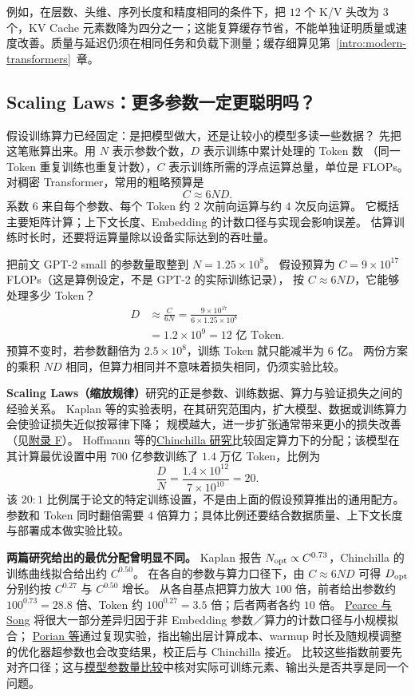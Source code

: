 例如，在层数、头维、序列长度和精度相同的条件下，把 $12$ 个 K/V 头改为 $3$ 个，KV Cache 元素数降为四分之一；这能复算缓存节省，不能单独证明质量或速度改善。质量与延迟仍须在相同任务和负载下测量；缓存细算见第~\ref*{intro:modern-transformers}~章。

\subsection{Scaling Laws：更多参数一定更聪明吗？}
\label{sec:scaling-compute-budget}

假设训练算力已经固定：是把模型做大，还是让较小的模型多读一些数据？
先把这笔账算出来。用 $N$ 表示参数个数，$D$ 表示训练中累计处理的 Token 数
（同一 Token 重复训练也重复计数），$C$ 表示训练所需的浮点运算总量，单位是 FLOPs。
对稠密 Transformer，常用的粗略预算是
\[
\boxed{C\approx6ND.}
\]
系数 $6$ 来自每个参数、每个 Token 约 $2$ 次前向运算与约 $4$ 次反向运算。
它概括主要矩阵计算；上下文长度、Embedding 的计数口径与实现会影响误差。
估算训练时长时，还要将运算量除以设备实际达到的吞吐量。

把前文 GPT-2 small 的参数量取整到 $N=1.25\times10^8$。
假设预算为 $C=9\times10^{17}$ FLOPs（这是算例设定，不是 GPT-2 的实际训练记录），
按 $C\approx6ND$，它能够处理多少 Token？
\[
\begin{aligned}
D&\approx\frac{C}{6N}
=\frac{9\times10^{17}}{6\times1.25\times10^8}\\
&=1.2\times10^9=\boxed{12\text{ 亿 Token}}.
\end{aligned}
\]
预算不变时，若参数翻倍为 $2.5\times10^8$，训练 Token 就只能减半为 $6$ 亿。
两份方案的乘积 $ND$ 相同，但算力相同并不意味着损失相同，仍须实验比较。

\textbf{Scaling Laws（缩放规律）}研究的正是参数、训练数据、算力与验证损失之间的经验关系。
Kaplan 等的实验表明，在其研究范围内，扩大模型、数据或训练算力会使验证损失近似按幂律下降；
规模越大，进一步扩张通常带来更小的损失改善（见\hyperref[source:scaling-laws]{附录 F}）。
Hoffmann 等的\hyperref[source:chinchilla]{Chinchilla 研究}比较固定算力下的分配；该模型在其计算最优设置中用
$700$ 亿参数训练了 $1.4$ 万亿 Token，比例为
\[
\frac{D}{N}=\frac{1.4\times10^{12}}{7\times10^{10}}=20.
\]
该 $20:1$ 比例属于论文的特定训练设置，不是由上面的假设预算推出的通用配方。
参数和 Token 同时翻倍需要 $4$ 倍算力；具体比例还要结合数据质量、上下文长度与部署成本做实验比较。

\textbf{两篇研究给出的最优分配曾明显不同。}
Kaplan 报告 $N_{\rm opt}\propto C^{0.73}$，Chinchilla 的训练曲线拟合给出约 $C^{0.50}$。
在各自的参数与算力口径下，由 $C\approx6ND$ 可得 $D_{\rm opt}$ 分别约按 $C^{0.27}$ 与 $C^{0.50}$ 增长。
从各自基点把算力放大 $100$ 倍，前者给出参数约 $100^{0.73}=28.8$ 倍、Token 约 $100^{0.27}=3.5$ 倍；后者两者各约 $10$ 倍。
\hyperref[source:scaling-reconciliation]{Pearce 与 Song} 将很大一部分差异归因于非 Embedding 参数／算力的计数口径与小规模拟合；
\hyperref[source:scaling-discrepancies]{Porian 等}通过复现实验，指出输出层计算成本、warmup 时长及随规模调整的优化器超参数也会改变结果，校正后与 Chinchilla 接近。
比较这些指数前要先对齐口径；这与\hyperref[sec:toy-real-model-comparison]{模型参数量比较}中核对实际可训练元素、输出头是否共享是同一个问题。

